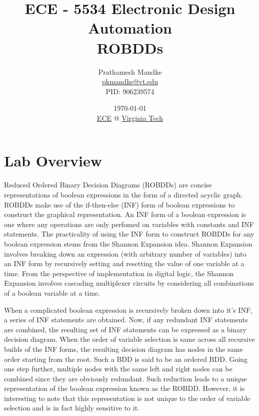 \documentclass[a4paper, titlepage, 12pt]{article}
\numberwithin{equation}{section}
\begin{document}
    \title{ECE - 5534 Electronic Design Automation \\ ROBDDs}
    \author{Prathamesh Mandke \\ \href{pkmandke@vt.edu}{pkmandke@vt.edu} \\ PID: 906239574}
    \date{\today \\ \href{https://ece.vt.edu}{ECE} @ \href{https://vt.edu}{Virginia Tech}}
    \maketitle
    \newpage

    \section{Lab Overview}

        Reduced Ordered Binary Decision Diagrams (ROBDDs) are concise representations of boolean expressions in the form of a directed acyclic graph.
        ROBDDs make use of the if-then-else (INF) form of boolean expressions to construct the graphical representation.
        An INF form of a boolean expression is one where any operations are only perfomed on variables with constants and INF statements.
        The practicality of using the INF form to construct ROBDDs for any boolean expression stems from the Shannon Expansion idea.
        Shannon Expansion involves breaking down an expression (with arbitrary number of variables) into an INF form by recursively setting and resetting the value of one variable at a time.
        From the perspective of implementation in digital logic, the Shannon Expansion involves cascading multiplexer circuits by considering all combinations of a boolean variable at a time.
        
        When a complicated boolean expression is recursively broken down into it's INF, a series of INF statements are obtained.
        Now, if any redundant INF statements are combined, the resulting set of INF statements can be expressed as a binary decision diagram.
        When the order of variable selection is same across all recursive builds of the INF forms, the resulting decision diagram has nodes in the same order starting from the root.
        Such a BDD is said to be an ordered BDD.
        Going one step further, multiple nodes with the same left and right nodes can be combined since they are obviously redundant.
        Such reduction leads to a unique representation of the boolean expression known as the ROBDD.
        However, it is interesting to note that this representation is not unique to the order of variable selection and is in fact highly sensitive to it.
        
\end{document}
